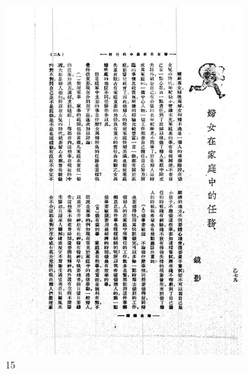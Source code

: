 \documentclass[12pt,twoside]{report}
\begin{document}
\begin{appendices}
\begin{figure}[htbp]
\begin{subfigure}[b]{0.23\linewidth}
        \includegraphics[width=\linewidth]{./figures/testset/15.jpg}
        \caption{15}
        \label{fig:test_15}
    \end{subfigure}
    \hfill
    \begin{subfigure}[b]{0.23\linewidth}

\end{subfigure}
\end{figure}
\end{appendices}
\end{document}
